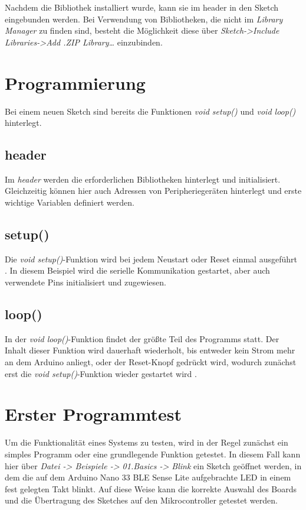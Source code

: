 Nachdem die Bibliothek installiert wurde, kann sie im header in den Sketch eingebunden werden.
Bei Verwendung von Bibliotheken, die nicht im \textit{Library Manager} zu finden sind, besteht die Möglichkeit diese über \textit{Sketch->Include Libraries->Add .ZIP Library…} einzubinden.

\section{Programmierung}
Bei einem neuen Sketch sind bereits die Funktionen \textit{void setup()} und \textit{void loop()} hinterlegt.

\subsection{header}
Im \textit{header} werden die erforderlichen Bibliotheken hinterlegt und initialisiert. Gleichzeitig können hier auch Adressen von Peripheriegeräten hinterlegt und erste wichtige Variablen definiert werden.

\subsection{setup()}
Die \textit{void setup()}-Funktion wird bei jedem Neustart oder Reset einmal ausgeführt \cite{ArdIDE.2024d}.
In diesem Beispiel wird die serielle Kommunikation gestartet, aber auch verwendete Pins initialisiert und zugewiesen.

\subsection{loop()}
In der \textit{void loop()}-Funktion findet der größte Teil des Programms statt. Der Inhalt dieser Funktion wird dauerhaft wiederholt, bis entweder kein Strom mehr an dem Arduino anliegt, oder der Reset-Knopf gedrückt wird, wodurch zunächst erst die \textit{void setup()}-Funktion wieder gestartet wird \cite{ArdIDE.2024e}.

\section{Erster Programmtest}
Um die Funktionalität eines Systems zu testen, wird in der Regel zunächst ein simples Programm oder eine grundlegende Funktion getestet.
In diesem Fall kann hier über \textit{Datei -> Beispiele -> 01.Basics -> Blink} ein Sketch geöffnet werden, in dem die auf dem Arduino Nano 33 BLE Sense Lite aufgebrachte LED in einem fest gelegten Takt blinkt. Auf diese Weise kann die korrekte Auswahl des Boards und die Übertragung des Sketches auf den Mikrocontroller getestet werden.


